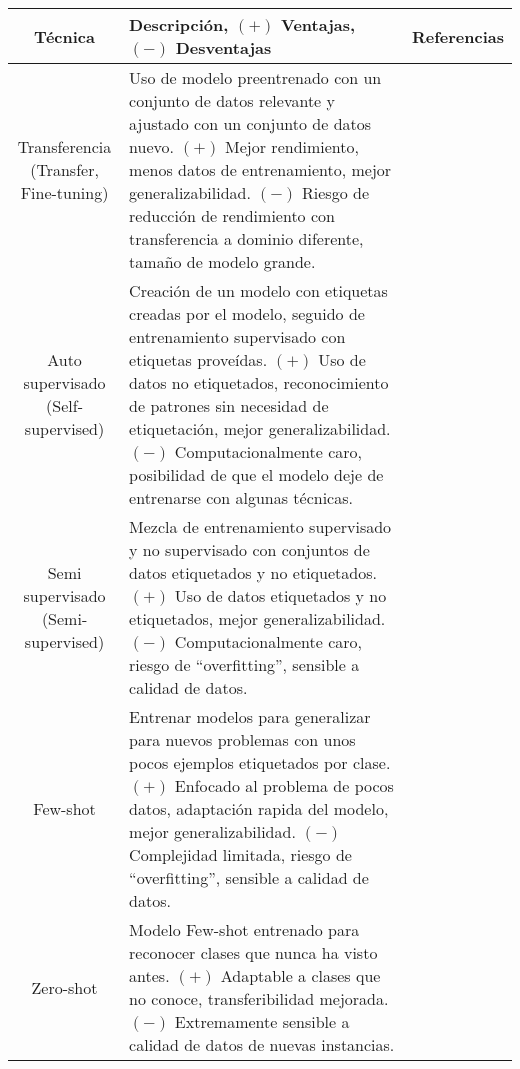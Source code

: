 \begin{center}
    \begin{table}[ht!]
        \small
        \begin{tabular}{ |c|m{9.5cm}|c| }
            \hline
            \bf Técnica & \bf Descripción, $(+)$ Ventajas, $(-)$ Desventajas & \bf Referencias \\
            \hline
            \makecell{Transferencia \\ (Transfer, Fine-tuning)} & Uso de modelo preentrenado con un conjunto de datos relevante y ajustado con un conjunto de datos nuevo. $(+)$ Mejor rendimiento, menos datos de entrenamiento, mejor generalizabilidad. $(-)$ Riesgo de reducción de rendimiento con transferencia a dominio diferente, tamaño de modelo grande. & \makecell{\autocite{safonova-2023,maggiori-2016-0,castelluccio-2015} \\ \autocite{nogueira-2017,zhong-2016,amato-2023}} \\
            \hline
            \makecell{Auto supervisado \\ (Self-supervised)} & Creación de un modelo con etiquetas creadas por el modelo, seguido de entrenamiento supervisado con etiquetas proveídas. $(+)$ Uso de datos no etiquetados, reconocimiento de patrones sin necesidad de etiquetación, mejor generalizabilidad. $(-)$ Computacionalmente caro, posibilidad de que el modelo deje de entrenarse con algunas técnicas. & \autocite{safonova-2023} \\
            \hline
            \makecell{Semi supervisado \\ (Semi-supervised)} & Mezcla de entrenamiento supervisado y no supervisado con conjuntos de datos etiquetados y no etiquetados. $(+)$ Uso de datos etiquetados y no etiquetados, mejor generalizabilidad. $(-)$ Computacionalmente caro, riesgo de \enquote{overfitting}, sensible a calidad de datos. & \autocite{safonova-2023} \\
            \hline
            Few-shot & Entrenar modelos para generalizar para nuevos problemas con unos pocos ejemplos etiquetados por clase. $(+)$ Enfocado al problema de pocos datos, adaptación rapida del modelo, mejor generalizabilidad. $(-)$ Complejidad limitada, riesgo de \enquote{overfitting}, sensible a calidad de datos. & \autocite{safonova-2023} \\
            \hline
            Zero-shot & Modelo Few-shot entrenado para reconocer clases que nunca ha visto antes. $(+)$ Adaptable a clases que no conoce, transferibilidad mejorada. $(-)$ Extremamente sensible a calidad de datos de nuevas instancias. & \autocite{safonova-2023} \\

\end{tabular}
\end{table}
\end{center}
